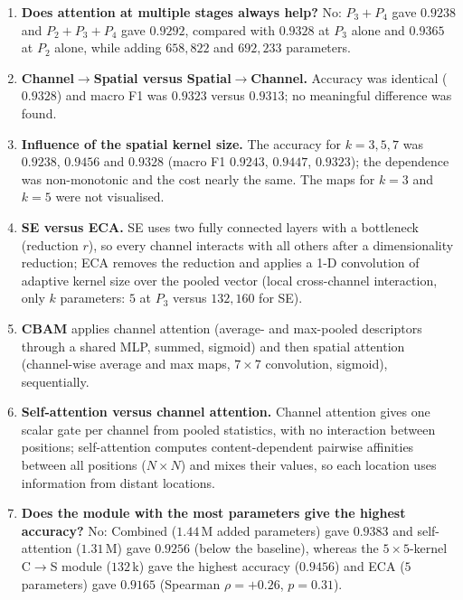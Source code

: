 \documentclass[10pt]{article}
\begin{document}
\begin{enumerate}
\item \textbf{Does attention at multiple stages always help?} No: $P_3{+}P_4$ gave $0.9238$ and $P_2{+}P_3{+}P_4$ gave $0.9292$, compared with $0.9328$ at $P_3$ alone and $0.9365$ at $P_2$ alone, while adding $658{,}822$ and $692{,}233$ parameters.

\item \textbf{Channel$\rightarrow$Spatial versus Spatial$\rightarrow$Channel.} Accuracy was identical ($0.9328$) and macro F1 was $0.9323$ versus $0.9313$; no meaningful difference was found.

\item \textbf{Influence of the spatial kernel size.} The accuracy for $k=3,5,7$ was $0.9238$, $0.9456$ and $0.9328$ (macro F1 $0.9243$, $0.9447$, $0.9323$); the dependence was non-monotonic and the cost nearly the same. The maps for $k=3$ and $k=5$ were not visualised.

\item \textbf{SE versus ECA.} SE uses two fully connected layers with a bottleneck (reduction $r$), so every channel interacts with all others after a dimensionality reduction; ECA removes the reduction and applies a 1-D convolution of adaptive kernel size over the pooled vector (local cross-channel interaction, only $k$ parameters: $5$ at $P_3$ versus $132{,}160$ for SE).

\item \textbf{CBAM} applies channel attention (average- and max-pooled descriptors through a shared MLP, summed, sigmoid) and then spatial attention (channel-wise average and max maps, $7\times7$ convolution, sigmoid), sequentially.

\item \textbf{Self-attention versus channel attention.} Channel attention gives one scalar gate per channel from pooled statistics, with no interaction between positions; self-attention computes content-dependent pairwise affinities between all positions ($N\times N$) and mixes their values, so each location uses information from distant locations.

\item \textbf{Does the module with the most parameters give the highest accuracy?} No: Combined ($1.44$\,M added parameters) gave $0.9383$ and self-attention ($1.31$\,M) gave $0.9256$ (below the baseline), whereas the $5\times5$-kernel C$\rightarrow$S module ($132$\,k) gave the highest accuracy ($0.9456$) and ECA ($5$ parameters) gave $0.9165$ (Spearman $\rho=+0.26$, $p=0.31$).


\end{enumerate}
\end{document}
